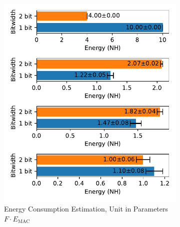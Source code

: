         \begin{figure}[H]
            \centering
            \begin{subfigure}[H]{0.48\textwidth}
                \includegraphics[width=\textwidth]{../timesteps/CIFAR10/plots/cifar10_test_energy_nh.pdf}
                \caption{Energy Consumption Estimation, Unit in Parameters $F\cdot E_{\text{MAC}}$}
            \end{subfigure}
            \hfill
            \begin{subfigure}[H]{0.48\textwidth}

\end{subfigure}
\end{figure}
